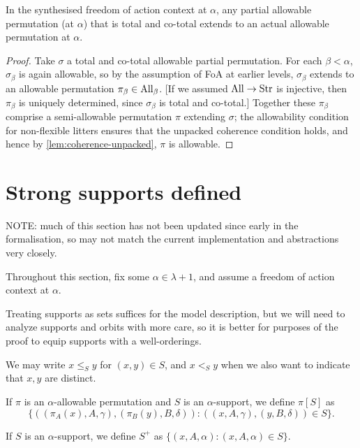 \begin{proposition}
  \label{prop:total-allowable-partial-perm-actual}
  In the synthesised freedom of action context at $\alpha$, any partial allowable permutation (at $\alpha$) that is total and co-total extends to an actual allowable permutation at $\alpha$.
\end{proposition}

\begin{proof}
  Take $\sigma$ a total and co-total allowable partial permutation.  For each $\beta < \alpha$, $\sigma_\beta$ is again allowable, so by the assumption of FoA at earlier levels, $\sigma_\beta$ extends to an allowable permutation $\pi_\beta \in \mathrm{All}_\beta$. [If we assumed $\mathrm{All} \to \mathrm{Str}$ is injective, then $\pi_\beta$ is uniquely determined, since $\sigma_\beta$ is total and co-total.]  Together these $\pi_\beta$ comprise a semi-allowable permutation $\pi$ extending $\sigma$; the allowability condition for non-flexible litters ensures that the unpacked coherence condition holds, and hence by \cref{lem:coherence-unpacked}, $\pi$ is allowable.
\end{proof}

\section{Strong supports defined}

NOTE: much of this section has not been updated since early in the formalisation, so may not match the current implementation and abstractions very closely.

Throughout this section, fix some $\alpha \in \lambda + 1$, and assume a freedom of action context at $\alpha$.

Treating supports as sets suffices for the model description, but we will need to analyze supports and orbits with more care, so it is better for purposes
of the proof to equip supports with a well-orderings.

We may write $x \leq_S y$ for $(x,y) \in S$, and $x <_S y$ when we also want to indicate that $x,y$ are distinct.

If $\pi$ is an $\alpha$-allowable permutation and $S$ is an $\alpha$-support, we define $\pi[S]$ as $$\{((\pi_A(x),A,\gamma),(\pi_B(y),B,\delta)):((x,A,\gamma),(y,B,\delta))\in S\}.$$

If $S$ is an $\alpha$-support, we define $S^+$ as $\{(x,A,\alpha):(x,A,\alpha) \in S\}$.

